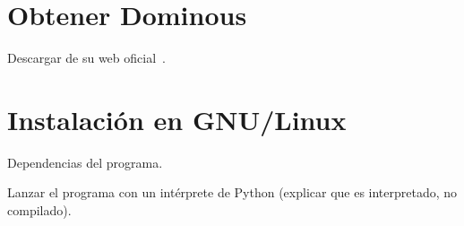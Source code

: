 

\section{Obtener Dominous}

Descargar de su web oficial~\cite{website:dominous}.

\section{Instalación en GNU/Linux}

Dependencias del programa.

Lanzar el programa con un intérprete de Python (explicar que es interpretado, no compilado).

